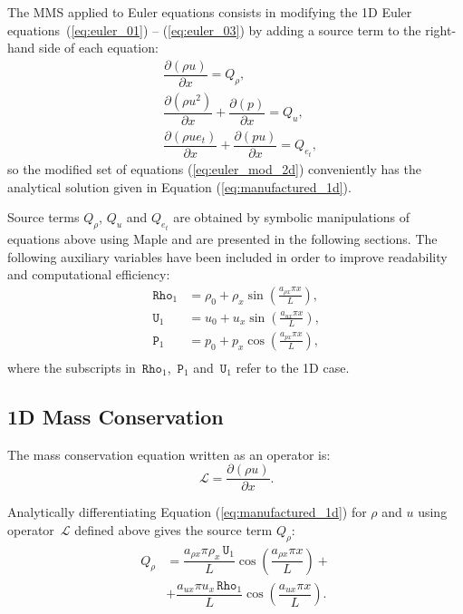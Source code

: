 \documentclass[10pt]{article}
\newcommand{\Diff}[2] {\dfrac{\partial( #1)}{\partial #2}}
\newcommand{\Rho}{\,\mathtt{Rho}}
\newcommand{\PP}{\,\mathtt{P}}
\newcommand{\U}{\,\mathtt{U}}
\newcommand{\Lo}{\,\mathcal{L}}
\begin{document}
The MMS applied to Euler equations consists in modifying the 1D Euler equations~(\ref{eq:euler_01}) -- (\ref{eq:euler_03}) by adding a source term to the right-hand side of each equation:
\begin{equation}
 \label{eq:euler_mod_2d}
\begin{split}
&\Diff{\rho u}{x} = Q_\rho,\\
&\Diff{\rho u^2 }{x}+ \Diff{p}{x} = Q_u,\\
&\Diff{\rho ue_t}{x}+ \Diff{pu}{x} = Q_{e_t},
\end{split}
\end{equation}
%
so the modified set of equations (\ref{eq:euler_mod_2d}) conveniently has the analytical solution given in Equation (\ref{eq:manufactured_1d}).
%

Source terms $Q_\rho$, $Q_u$ and $Q_{e_t}$ are obtained by symbolic manipulations of equations above using Maple and are presented in the following sections. The following auxiliary variables have been included in order to improve readability and computational efficiency:
\begin{equation*}
 \begin{split}
\label{eq:aux_1d}
\Rho_1 &= \rho_{0}+ \rho_{x} \sin\left(\frac{a_{ \rho x} \pi x}{L}\right),\\
\U_1 &= u_{0}+u_{x} \sin\left(\frac{a_{u x} \pi x}{L}\right),\\
\PP_1 &= p_{0}+p_{x} \cos\left(\frac{a_{p x} \pi x}{L}\right),\\
\end{split}
\end{equation*}
where the subscripts in $\Rho_1$, $\PP_1$ and $\U_1$ refer to the 1D case.

\subsection{1D Mass Conservation}

The mass conservation equation written as an operator is:
\begin{equation*}
 \Lo= \Diff{\rho u}{x}.
\end{equation*}

Analytically differentiating Equation (\ref{eq:manufactured_1d}) for $\rho$ and $u$  using operator $\Lo$ defined above gives  the source term $Q_{\rho}$:
\begin{equation}
 \begin{split}
Q_\rho &= \dfrac{a_{\rho x} \pi \rho_x \U_1}{L}\cos\left(\dfrac{a_{\rho x} \pi x}{L}\right) +\\
&+\dfrac{a_{ux} \pi u_x \Rho_1}{L}\cos\left(\dfrac{a_{ux} \pi x}{L}\right) .
 \end{split}
\end{equation}
\end{document}
